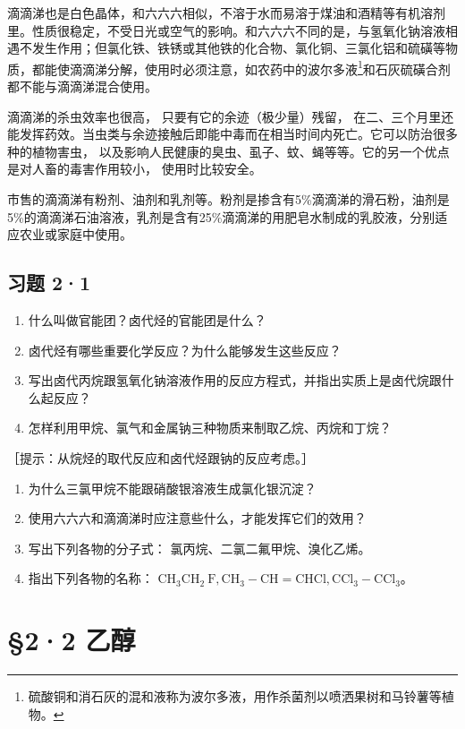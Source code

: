 滴滴涕也是白色晶体，和六六六相似，不溶于水而易溶于煤油和酒精等有机溶剂里。性质很稳定，不受日光或空气的影响。和六六六不同的是，与氢氧化钠溶液相遇不发生作用；但氯化铁、铁锈或其他铁的化合物、氯化铜、三氯化铝和硫磺等物质，都能使滴滴涕分解，使用时必须注意，如农药中的波尔多液\footnote{硫酸铜和消石灰的混和液称为波尔多液，用作杀菌剂以喷洒果树和马铃薯等植物。}和石灰硫磺合剂都不能与滴滴涕混合使用。

滴滴涕的杀虫效率也很高， 只要有它的余迹（极少量）残留，
在二、三个月里还能发挥药效。当虫类与余迹接触后即能中毒而在相当时间内死亡。它可以防治很多种的植物害虫，
以及影响人民健康的臭虫、虱子、蚊、蝇等等。它的另一个优点是对人畜的毒害作用较小，
使用时比较安全。

市售的滴滴涕有粉剂、油剂和乳剂等。粉剂是掺含有5\%滴滴涕的滑石粉，油剂是5\%的滴滴涕石油溶液，乳剂是含有25\%滴滴涕的用肥皂水制成的乳胶液，分别适应农业或家庭中使用。

\subsection{习题 2·1}

\begin{enumerate}
\item
  什么叫做官能团？卤代烃的官能团是什么？
\item
  卤代烃有哪些重要化学反应？为什么能够发生这些反应？
\item
  写出卤代丙烷跟氢氧化钠溶液作用的反应方程式，并指出实质上是卤代烷跟什么起反应？
\item
  怎样利用甲烷、氯气和金属钠三种物质来制取乙烷、丙烷和丁烷？
\end{enumerate}

［提示：从烷烃的取代反应和卤代烃跟钠的反应考虑。］

\begin{enumerate}[start=5]
\item
  为什么三氯甲烷不能跟硝酸银溶液生成氯化银沉淀？
\item
  使用六六六和滴滴涕时应注意些什么，才能发挥它们的效用？
\item
  写出下列各物的分子式： 氯丙烷、二氯二氟甲烷、溴化乙烯。
\item
  指出下列各物的名称：
  \(\mathrm{CH}_{3} \mathrm{CH}_{2} \mathrm{~F}, \mathrm{CH}_{3}-\mathrm{CH}=\mathrm{CHCl}, \mathrm{CCl}_{3}-\mathrm{CCl}_{3}\)。
\end{enumerate}

\section{§2·2 乙醇}

